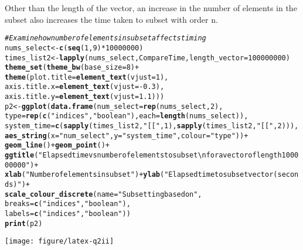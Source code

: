 \documentclass{article}\usepackage[]{graphicx}\usepackage[]{color}
\makeatletter
\def\maxwidth{ %
  \ifdim\Gin@nat@width>\linewidth
    \linewidth
  \else
    \Gin@nat@width
  \fi
}
\newcommand{\hlnum}[1]{\textcolor[rgb]{0.686,0.059,0.569}{#1}}%
\newcommand{\hlstr}[1]{\textcolor[rgb]{0.192,0.494,0.8}{#1}}%
\newcommand{\hlcom}[1]{\textcolor[rgb]{0.678,0.584,0.686}{\textit{#1}}}%
\newcommand{\hlopt}[1]{\textcolor[rgb]{0,0,0}{#1}}%
\newcommand{\hlstd}[1]{\textcolor[rgb]{0.345,0.345,0.345}{#1}}%
\newcommand{\hlkwb}[1]{\textcolor[rgb]{0.69,0.353,0.396}{#1}}%
\newcommand{\hlkwc}[1]{\textcolor[rgb]{0.333,0.667,0.333}{#1}}%
\newcommand{\hlkwd}[1]{\textcolor[rgb]{0.737,0.353,0.396}{\textbf{#1}}}%
\newenvironment{kframe}{%
 \def\at@end@of@kframe{}%
 \ifinner\ifhmode%
  \def\at@end@of@kframe{\end{minipage}}%
  \begin{minipage}{\columnwidth}%
 \fi\fi%
 \def\FrameCommand##1{\hskip\@totalleftmargin \hskip-\fboxsep
 \colorbox{shadecolor}{##1}\hskip-\fboxsep
     \hskip-\linewidth \hskip-\@totalleftmargin \hskip\columnwidth}%
 \MakeFramed {\advance\hsize-\width
   \@totalleftmargin\z@ \linewidth\hsize
   \@setminipage}}%
 {\par\unskip\endMakeFramed%
 \at@end@of@kframe}
\newenvironment{knitrout}{}{} %
\makeatother
\begin{document}
Other than the length of the vector, an increase in the number of elements in the subset also increases the time taken to subset with order n.
\begin{knitrout}
\color{fgcolor}\begin{kframe}
\begin{alltt}
 \hlcom{# Examine how number of elements in subset affects timing}
 \hlstd{nums_select} \hlkwb{<-} \hlkwd{c}\hlstd{(}\hlkwd{seq}\hlstd{(}\hlnum{1}\hlstd{,} \hlnum{9}\hlstd{)}\hlopt{*}\hlnum{10000000}\hlstd{)}
 \hlstd{times_list2} \hlkwb{<-} \hlkwd{lapply}\hlstd{(nums_select, CompareTime,} \hlkwc{length_vector} \hlstd{=} \hlnum{100000000}\hlstd{)}
 \hlkwd{theme_set}\hlstd{(}\hlkwd{theme_bw}\hlstd{(}\hlkwc{base_size} \hlstd{=} \hlnum{8}\hlstd{)} \hlopt{+}
             \hlkwd{theme}\hlstd{(}\hlkwc{plot.title} \hlstd{=} \hlkwd{element_text}\hlstd{(}\hlkwc{vjust} \hlstd{=} \hlnum{1}\hlstd{),}
                   \hlkwc{axis.title.x} \hlstd{=} \hlkwd{element_text}\hlstd{(}\hlkwc{vjust} \hlstd{=} \hlopt{-}\hlnum{0.3}\hlstd{),}
                   \hlkwc{axis.title.y} \hlstd{=} \hlkwd{element_text}\hlstd{(}\hlkwc{vjust} \hlstd{=} \hlnum{1.1}\hlstd{)))}
 \hlstd{p2} \hlkwb{<-} \hlkwd{ggplot}\hlstd{(}\hlkwd{data.frame}\hlstd{(}\hlkwc{num_select} \hlstd{=} \hlkwd{rep}\hlstd{(nums_select,} \hlnum{2}\hlstd{),}
                         \hlkwc{type} \hlstd{=} \hlkwd{rep}\hlstd{(}\hlkwd{c}\hlstd{(}\hlstr{"indices"}\hlstd{,} \hlstr{"boolean"}\hlstd{),} \hlkwc{each} \hlstd{=} \hlkwd{length}\hlstd{(nums_select)),}
                         \hlkwc{system_time} \hlstd{=} \hlkwd{c}\hlstd{(}\hlkwd{sapply}\hlstd{(times_list2,} \hlstr{"[["}\hlstd{,} \hlnum{1}\hlstd{),} \hlkwd{sapply}\hlstd{(times_list2,} \hlstr{"[["}\hlstd{,} \hlnum{2}\hlstd{))),}
              \hlkwd{aes_string}\hlstd{(}\hlkwc{x} \hlstd{=} \hlstr{"num_select"}\hlstd{,} \hlkwc{y} \hlstd{=} \hlstr{"system_time"}\hlstd{,} \hlkwc{colour} \hlstd{=} \hlstr{"type"}\hlstd{))} \hlopt{+}
   \hlkwd{geom_line}\hlstd{()} \hlopt{+} \hlkwd{geom_point}\hlstd{()} \hlopt{+}
   \hlkwd{ggtitle}\hlstd{(}\hlstr{"Elapsed time vs number of elements to subset\textbackslash{}nfor a vector of length 100000000"}\hlstd{)} \hlopt{+}
   \hlkwd{xlab}\hlstd{(}\hlstr{"Number of elements in subset"}\hlstd{)} \hlopt{+} \hlkwd{ylab}\hlstd{(}\hlstr{"Elapsed time to subset vector (seconds)"}\hlstd{)} \hlopt{+}
   \hlkwd{scale_colour_discrete}\hlstd{(}\hlkwc{name} \hlstd{=} \hlstr{"Subsetting based on"}\hlstd{,}
                         \hlkwc{breaks} \hlstd{=} \hlkwd{c}\hlstd{(}\hlstr{"indices"}\hlstd{,} \hlstr{"boolean"}\hlstd{),}
                         \hlkwc{labels} \hlstd{=} \hlkwd{c}\hlstd{(}\hlstr{"indices"}\hlstd{,} \hlstr{"boolean"}\hlstd{))}
 \hlkwd{print}\hlstd{(p2)}
\end{alltt}
\end{kframe}
\texttt{[image: figure/latex-q2ii]} 

\end{knitrout}
\end{document}
